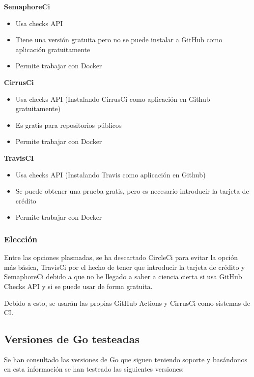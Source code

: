 \textbf{SemaphoreCi}

\begin{itemize}
\item
  Usa checks API
\item
  Tiene una versión gratuita pero no se puede instalar a GitHub como
  aplicación gratuitamente
\item
  Permite trabajar con Docker
\end{itemize}

\textbf{CirrusCi}

\begin{itemize}
\item
  Usa checks API (Instalando CirrusCi como aplicación en Github
  gratuitamente)
\item
  Es gratis para repositorios públicos
\item
  Permite trabajar con Docker
\end{itemize}

\textbf{TravisCI}

\begin{itemize}
\item
  Usa checks API (Instalando Travis como aplicación en Github)
\item
  Se puede obtener una prueba gratis, pero es necesario introducir la
  tarjeta de crédito
\item
  Permite trabajar con Docker
\end{itemize}

\subsubsection{Elección}

Entre las opciones plasmadas, se ha descartado CircleCi para evitar la
opción más básica, TravisCi por el hecho de tener que introducir la
tarjeta de crédito y SemaphoreCi debido a que no he llegado a saber a
ciencia cierta si usa GitHub Checks API y si se puede usar de forma
gratuita.

Debido a esto, se usarán las propias GitHub Actions y CirrusCi como
sistemas de CI.

\subsection{Versiones de Go testeadas}

Se han consultado \href{https://endoflife.date/go}{las versiones de Go
que siguen teniendo soporte} y basándonos en esta información se han
testeado las siguientes versiones:

